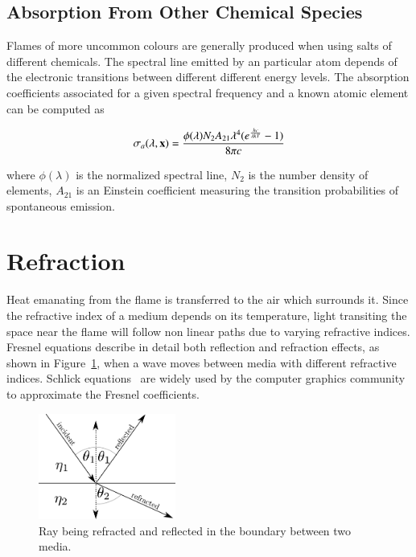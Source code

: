 \subsection{Absorption From Other Chemical Species}
\label{sec:absorption_from_chemical_species}

Flames of more uncommon colours are generally produced when using salts of different chemicals.
The spectral line emitted by an particular atom depends of the electronic transitions between different different energy levels.
The absorption coefficients associated for a given spectral frequency and a known atomic element can be computed as


\begin{equation}
\sigma_a(\lambda, \mathbf{x}) = \frac{\phi(\lambda) N_2 A_{21} \lambda^4 (e ^\frac{h c}{\lambda k T} - 1)}{8 \pi c}
\end{equation}

where $\phi(\lambda)$ is the normalized spectral line, $N_2$ is the number density of elements, $A_{21}$ is an Einstein coefficient measuring the transition probabilities of spontaneous emission.

\section{Refraction}
\label{sec:refraction}

Heat emanating from the flame is transferred to the air which surrounds it.
Since the refractive index of a medium depends on its temperature, light transiting the space near the flame will follow non linear paths due to varying refractive indices.
Fresnel equations describe in detail both reflection and refraction effects, as shown in Figure~\ref{fig:refraction_diag}, when a wave moves between media with different refractive indices.
Schlick equations~\cite{Schlick1994} are widely used by the computer graphics community to approximate the Fresnel coefficients.

\begin{figure}[htbp!]
	\centering
	\includegraphics[width=0.4\textwidth]{img/refraction_diag}
	\caption{Ray being refracted and reflected in the boundary between two media.}
	\label{fig:refraction_diag}
\end{figure}

